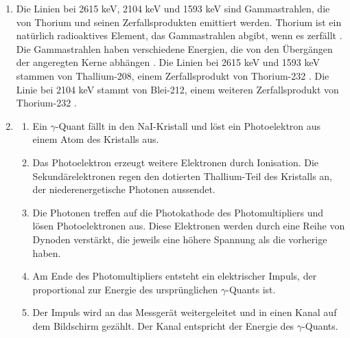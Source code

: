 \documentclass[11pt, a4paper]{article}
\begin{document}
\begin{enumerate}
        \item Die Linien bei 2615 keV, 2104 keV und 1593 keV sind Gammastrahlen, die von Thorium und seinen Zerfallsprodukten emittiert werden. Thorium ist ein natürlich radioaktives Element, das Gammastrahlen abgibt, wenn es zerfällt \cite{thorium_gamma_spectrometry} \cite{radionuclide_basics_thorium}. Die Gammastrahlen haben verschiedene Energien, die von den Übergängen der angeregten Kerne abhängen \cite{gamma-ray_spectrometer}. Die Linien bei 2615 keV und 1593 keV stammen von Thallium-208, einem Zerfallsprodukt von Thorium-232 \cite{analysis_of_uranium_and_thorium_lines} \cite{the_th-232_decay_chain}. Die Linie bei 2104 keV stammt von Blei-212, einem weiteren Zerfallsprodukt von Thorium-232 \cite{the_th-232_decay_chain}.
        \item \begin{enumerate} \item Ein $\gamma$-Quant fällt in den NaI-Kristall und löst ein Photoelektron aus einem Atom des Kristalls aus. \item Das Photoelektron erzeugt weitere Elektronen durch Ionisation. Die Sekundärelektronen regen den dotierten Thallium-Teil des Kristalls an, der niederenergetische Photonen aussendet. \item Die Photonen treffen auf die Photokathode des Photomultipliers und lösen Photoelektronen aus. Diese Elektronen werden durch eine Reihe von Dynoden verstärkt, die jeweils eine höhere Spannung als die vorherige haben. \item Am Ende des Photomultipliers entsteht ein elektrischer Impuls, der proportional zur Energie des ursprünglichen $\gamma$-Quants ist. \item Der Impuls wird an das Messgerät weitergeleitet und in einen Kanal auf dem Bildschirm gezählt. Der Kanal entspricht der Energie des $\gamma$-Quants. \end{enumerate}
    \end{enumerate}

    
    
\end{document}
